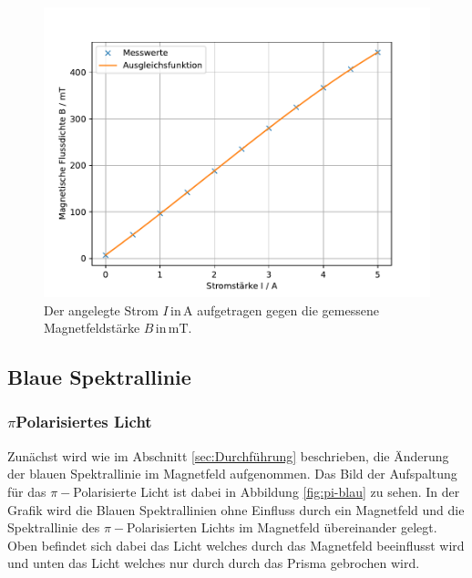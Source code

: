 \begin{figure}
    \centering
    \includegraphics[width=\textwidth]{content/data/magnetfeld.pdf}
    \caption{Der angelegte Strom $I \, \text{in} \, \si{\ampere}$ aufgetragen gegen die gemessene Magnetfeldstärke $B \, \text{in} \, \si{\milli\tesla}$.}
    \label{fig:Magnetfeld}
\end{figure}

\subsection{Blaue Spektrallinie}

\subsubsection{ \texorpdfstring{$\pi$}-Polarisiertes Licht}
Zunächst wird wie im Abschnitt \ref{sec:Durchführung} beschrieben, die Änderung der blauen Spektrallinie im Magnetfeld aufgenommen.
Das Bild der Aufspaltung für das $\pi -$Polarisierte Licht ist dabei in Abbildung \ref{fig:pi-blau} zu sehen.
In der Grafik wird die Blauen Spektrallinien ohne Einfluss durch ein Magnetfeld und die Spektrallinie des $\pi -$Polarisierten Lichts im Magnetfeld übereinander gelegt.
Oben befindet sich dabei das Licht welches durch das Magnetfeld beeinflusst wird und unten das Licht welches nur durch durch das Prisma gebrochen wird.

